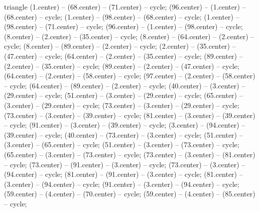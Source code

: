 {\begin{pgfonlayer}{triangle}
 (1.center) -- (68.center) -- (71.center) -- cycle; 
 (96.center) -- (1.center) -- (68.center) -- cycle; 
 (1.center) -- (98.center) -- (68.center) -- cycle; 
 (1.center) -- (98.center) -- (71.center) -- cycle; 
 (96.center) -- (1.center) -- (98.center) -- cycle; 
 (8.center) -- (2.center) -- (35.center) -- cycle; 
 (8.center) -- (64.center) -- (2.center) -- cycle; 
 (8.center) -- (89.center) -- (2.center) -- cycle; 
 (2.center) -- (35.center) -- (47.center) -- cycle; 
 (64.center) -- (2.center) -- (35.center) -- cycle; 
 (89.center) -- (2.center) -- (35.center) -- cycle; 
 (89.center) -- (2.center) -- (47.center) -- cycle; 
 (64.center) -- (2.center) -- (58.center) -- cycle; 
 (97.center) -- (2.center) -- (58.center) -- cycle; 
 (64.center) -- (89.center) -- (2.center) -- cycle; 
 (40.center) -- (3.center) -- (29.center) -- cycle; 
 (51.center) -- (3.center) -- (29.center) -- cycle; 
 (65.center) -- (3.center) -- (29.center) -- cycle; 
 (73.center) -- (3.center) -- (29.center) -- cycle; 
 (73.center) -- (3.center) -- (39.center) -- cycle; 
 (81.center) -- (3.center) -- (39.center) -- cycle; 
 (91.center) -- (3.center) -- (39.center) -- cycle; 
 (3.center) -- (94.center) -- (39.center) -- cycle; 
 (40.center) -- (73.center) -- (3.center) -- cycle; 
 (51.center) -- (3.center) -- (65.center) -- cycle; 
 (51.center) -- (3.center) -- (73.center) -- cycle; 
 (65.center) -- (3.center) -- (73.center) -- cycle; 
 (73.center) -- (3.center) -- (81.center) -- cycle; 
 (73.center) -- (91.center) -- (3.center) -- cycle; 
 (73.center) -- (3.center) -- (94.center) -- cycle; 
 (81.center) -- (91.center) -- (3.center) -- cycle; 
 (81.center) -- (3.center) -- (94.center) -- cycle; 
 (91.center) -- (3.center) -- (94.center) -- cycle; 
 (59.center) -- (4.center) -- (70.center) -- cycle; 
 (59.center) -- (4.center) -- (85.center) -- cycle; 

\end{pgfonlayer}}
